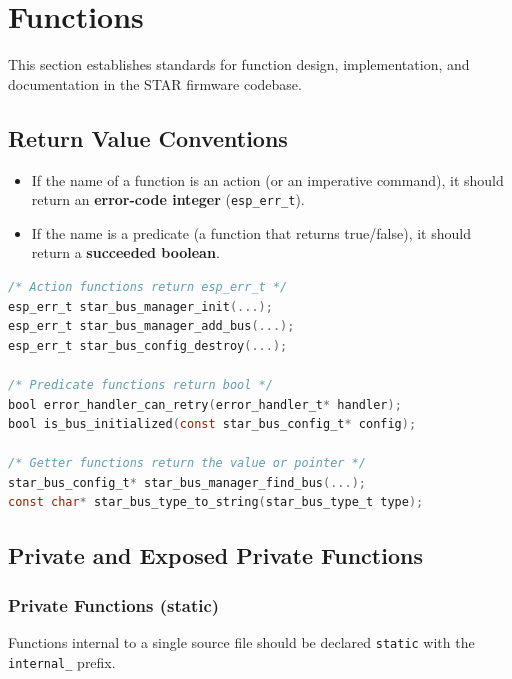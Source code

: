 \section{Functions}

This section establishes standards for function design, implementation, and documentation in the STAR firmware codebase.

\subsection{Return Value Conventions}

\begin{itemize}
    \item If the name of a function is an action (or an imperative command), it should return an \textbf{error-code integer} (\texttt{esp\_err\_t}).
    \item If the name is a predicate (a function that returns true/false), it should return a \textbf{succeeded boolean}.
\end{itemize}

\begin{lstlisting}[language=C]
/* Action functions return esp_err_t */
esp_err_t star_bus_manager_init(...);
esp_err_t star_bus_manager_add_bus(...);
esp_err_t star_bus_config_destroy(...);

/* Predicate functions return bool */
bool error_handler_can_retry(error_handler_t* handler);
bool is_bus_initialized(const star_bus_config_t* config);

/* Getter functions return the value or pointer */
star_bus_config_t* star_bus_manager_find_bus(...);
const char* star_bus_type_to_string(star_bus_type_t type);
\end{lstlisting}

\subsection{Private and Exposed Private Functions}

\subsubsection{Private Functions (static)}

Functions internal to a single source file should be declared \texttt{static} with the \texttt{internal\_} prefix.

